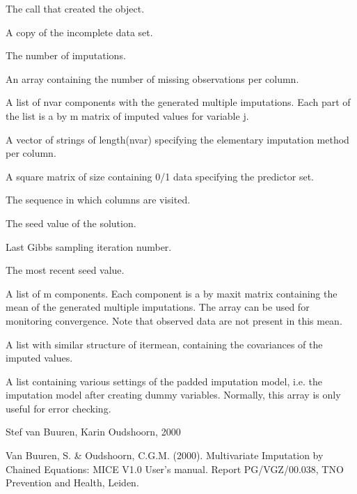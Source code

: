 \begin{Value}
\begin{ldescription}
\item[\code{call}] The call that created the object.
\item[\code{data}] A copy of the incomplete data set.
\item[\code{m}] The number of imputations.
\item[\code{nmis}] An array containing the number of missing observations per column.
\item[\code{imp}] A list of nvar components with the generated multiple imputations. 
Each part of the list is a  by m matrix of imputed values for 
variable j.
\item[\code{imputationMethod}] A vector of strings of length(nvar) specifying the elementary 
imputation method per column.
\item[\code{predictorMatrix}] A square matrix of size  containing 0/1 data specifying 
the predictor set.
\item[\code{visitSequence}] The sequence in which columns are visited.
\item[\code{seed}] The seed value of the solution.
\item[\code{iteration}] Last Gibbs sampling iteration number.
\item[\code{lastSeedValue}] The most recent seed value.
\item[\code{chainMean}] A list of m components. Each component is a 
by maxit matrix containing the mean of the generated multiple 
imputations. The array can be used for monitoring convergence.
Note that observed data are not present in this mean.
\item[\code{chainCov}] A list with similar structure of itermean, containing the covariances 
of the imputed values.
\item[\code{pad}] A list containing various settings of the padded imputation model, 
i.e. the imputation model after creating dummy variables. Normally, 
this array is only useful for error checking.
\end{ldescription}
\end{Value}
\begin{Author}\relax
Stef van Buuren, Karin Oudshoorn, 2000
\end{Author}
\begin{References}\relax
Van Buuren, S. \& Oudshoorn, C.G.M. (2000). Multivariate Imputation by Chained Equations: 
MICE V1.0 User's manual. Report PG/VGZ/00.038, TNO Prevention and Health, Leiden.
\end{References}

